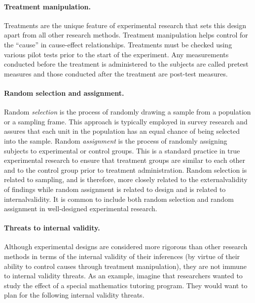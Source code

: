 \paragraph{Treatment manipulation.} Treatments are the unique feature of experimental research that sets this design apart from all other research methods. Treatment manipulation helps control for the ``cause'' in cause-effect relationships. Treatments must be checked using various pilot tests prior to the start of the experiment. Any measurements conducted before the treatment is administered to the subjects are called pretest measures and those conducted after the treatment are post-test measures. 

\paragraph{Random selection and assignment.} Random \textit{selection} is the process of randomly drawing a sample from a population or a sampling frame. This approach is typically employed in survey research and assures that each unit in the population has an equal chance of being selected into the sample. Random \textit{assignment} is the process of randomly assigning subjects to experimental or control groups. This is a standard practice in true experimental research to ensure that treatment groups are similar to each other and to the control group prior to treatment administration. Random selection is related to sampling, and is therefore, more closely related to the \gls{externalvalidity} of findings while random assignment is related to design and is related to \gls{internalvalidity}. It is common to include both random selection and random assignment in well-designed experimental research.

\paragraph{Threats to internal validity.} Although experimental designs are considered more rigorous than other research methods in terms of the internal validity of their inferences (by virtue of their ability to control causes through treatment manipulation), they are not immune to internal validity threats. As an example, imagine that researchers wanted to study the effect of a special mathematics tutoring program. They would want to plan for the following internal validity threats.

